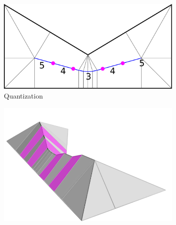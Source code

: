 \begin{figure}
\begin{subfigure}{\figwidth}
\includegraphics[width=\figheight]{sources/method/overview/2D/rounded.pdf}
\caption{Quantization}\label{3d_surface_overview_rounded}
\end{subfigure}
\begin{subfigure}{\figwidth}\centering
\hspace*{\tempheightTwo}
\includegraphics[height=\figheight]{sources/method/overview/surface/smoothed_magenta.png}

\vspace{\tempheight}


\end{subfigure}
\end{figure}
